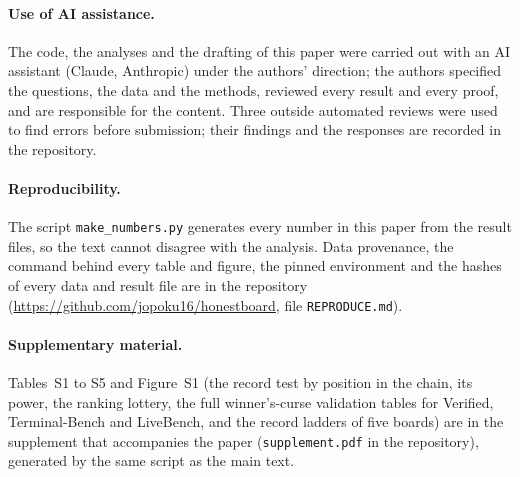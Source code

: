 \documentclass[11pt]{article}
\begin{document}
\paragraph{Use of AI assistance.}
The code, the analyses and the drafting of this paper were carried out with an AI assistant (Claude, Anthropic) under the authors' direction; the authors specified the questions, the data and the methods, reviewed every result and every proof, and are responsible for the content.
Three outside automated reviews were used to find errors before submission; their findings and the responses are recorded in the repository.

\paragraph{Reproducibility.}
The script \texttt{make\_numbers.py} generates every number in this paper from the result files, so the text cannot disagree with the analysis. Data provenance, the command behind every table and figure, the pinned environment and the hashes of every data and result file are in the repository (\url{https://github.com/jopoku16/honestboard}, file \texttt{REPRODUCE.md}).

\paragraph{Supplementary material.}
Tables~S1 to S5 and Figure~S1 (the record test by position in the chain, its power, the ranking lottery, the full winner's-curse validation tables for Verified, Terminal-Bench and LiveBench, and the record ladders of five boards) are in the supplement that accompanies the paper (\texttt{supplement.pdf} in the repository), generated by the same script as the main text.




\appendix
\end{document}
